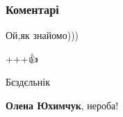  
 
 
 
 
\subsubsection{Коментарі}

\begin{itemize}

 
Ой,як знайомо)))

 
+++👍

 
Бєздєльнік

\begin{itemize}
 
\textbf{Олена Юхимчук}, нероба! 🤣💦
\end{itemize}

 


\end{itemize}
